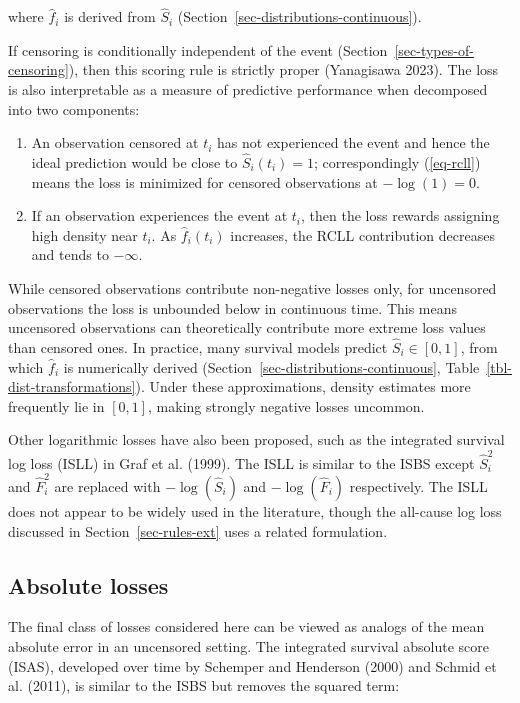 \documentclass[
  letterpaper,
  krantz2]{style/krantz}
\providecommand{\tightlist}{%
  \setlength{\itemsep}{0pt}\setlength{\parskip}{0pt}}
\begin{document}
where \(\hat{f}_i\) is derived from \(\hat{S}_i\)
(Section~\ref{sec-distributions-continuous}).

If censoring is conditionally independent of the event
(Section~\ref{sec-types-of-censoring}), then this scoring rule is
strictly proper (Yanagisawa 2023). The loss is also interpretable as a
measure of predictive performance when decomposed into two components:

\begin{enumerate}
\def\labelenumi{\arabic{enumi}.}
\tightlist
\item
  An observation censored at \(t_i\) has not experienced the event and
  hence the ideal prediction would be close to \(\hat{S}_i(t_i) = 1\);
  correspondingly (\ref{eq-rcll}) means the loss is minimized for
  censored observations at \(-\log(1) = 0\).
\item
  If an observation experiences the event at \(t_i\), then the loss
  rewards assigning high density near \(t_i\). As \(\hat{f}_i(t_i)\)
  increases, the RCLL contribution decreases and tends to \(-\infty\).
\end{enumerate}

While censored observations contribute non-negative losses only, for
uncensored observations the loss is unbounded below in continuous time.
This means uncensored observations can theoretically contribute more
extreme loss values than censored ones. In practice, many survival
models predict \(\hat{S}_i \in [0,1]\), from which \(\hat{f}_i\) is
numerically derived (Section~\ref{sec-distributions-continuous},
Table~\ref{tbl-dist-transformations}). Under these approximations,
density estimates more frequently lie in \([0,1]\), making strongly
negative losses uncommon.

Other logarithmic losses have also been proposed, such as the integrated
survival log loss (ISLL) in Graf et
al. (1999). The ISLL is similar to the ISBS except \(\hat{S}_i^2\) and
\(\hat{F}_i^2\) are replaced with \(-\log(\hat{S}_i)\) and
\(-\log(\hat{F}_i)\) respectively. The ISLL does not appear to be widely
used in the literature, though the all-cause log loss discussed in
Section~\ref{sec-rules-ext} uses a related formulation.

\subsection{Absolute losses}\label{absolute-losses}

The final class of losses considered here can be viewed as analogs of
the mean absolute error in an uncensored setting. The integrated
survival absolute score
(ISAS), developed over time by
Schemper and Henderson (2000) and Schmid et al. (2011), is similar to
the ISBS but removes the squared term:
\end{document}
